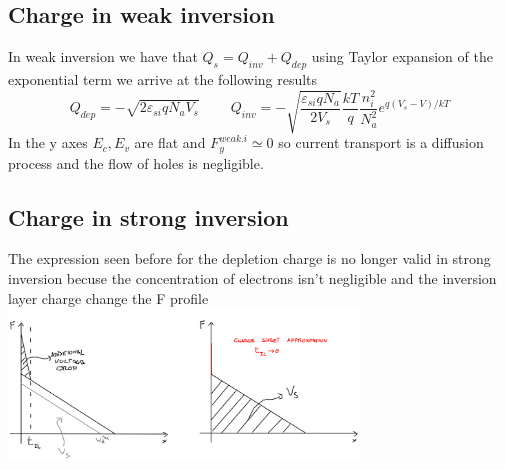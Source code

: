 \subsection{Charge in weak inversion}
In weak inversion we have that $Q_s=Q_{inv}+Q_{dep}$  using Taylor expansion of the exponential term we arrive at the following results
\begin{equation}
Q_{dep}=-\sqrt{2\varepsilon_{si}qN_aV_s}\ \ \ \ \ \ \ \ \ \   Q_{inv}=-\sqrt{\frac{\varepsilon_{si}qN_a}{2V_s}}\frac{kT}{q}\frac{n_i^2}{N_a^2}e^{q(V_s-V)/kT}
\end{equation}
In the y axes $E_c, E_v$ are flat and $F_y^{weak.i}\simeq0$ so current transport is a diffusion process and the flow of holes is negligible.\\

\vspace{3mm}
\centering
{}
\raggedright

\subsection{Charge in strong inversion}
The expression seen before for the depletion charge is no longer valid in strong inversion becuse the concentration of electrons isn't negligible and the inversion layer charge change the F profile \\


\centering
\includegraphics[width=0.7\textwidth]{csa.png}\\
\raggedright

